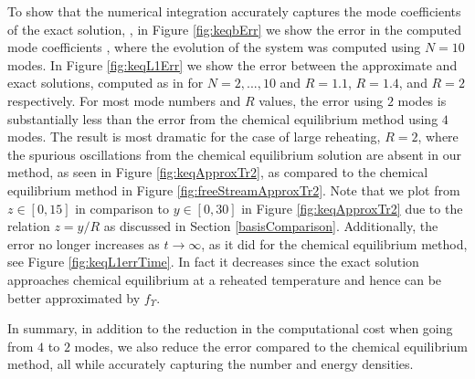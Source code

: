 To show that the numerical integration accurately captures the mode coefficients of the exact solution, , in Figure \ref{fig:keqbErr} we show the error in the computed mode coefficients , where the evolution of the system was computed using $N=10$ modes. In Figure \ref{fig:keqL1Err} we show the error between the approximate and exact solutions, computed as in  for $N=2,...,10$ and $R=1.1$, $R=1.4$, and $R=2$ respectively.  For most mode numbers and $R$ values, the error using $2$ modes is substantially less than the error from the chemical equilibrium method using $4$ modes.  The result is most dramatic for the case of large reheating, $R=2$, where the spurious oscillations from the chemical equilibrium solution are absent in our method, as seen in Figure \ref{fig:keqApproxTr2}, as compared to the chemical equilibrium method in Figure \ref{fig:freeStreamApproxTr2}.  Note that we plot from $z\in [0,15]$ in comparison to $y\in[0,30]$ in Figure \ref{fig:keqApproxTr2} due to the relation $z=y/R$ as discussed in Section \ref{basisComparison}. Additionally, the error no longer increases as $t\rightarrow\infty$, as it did for the chemical equilibrium method, see Figure \ref{fig:keqL1errTime}.  In fact it decreases since the exact solution approaches chemical equilibrium at a reheated temperature and hence can be better approximated by $f_\Upsilon$. 

In summary, in addition to the reduction in the computational cost when going from $4$ to $2$ modes, we also reduce the error compared to the chemical equilibrium method, all while accurately capturing the number and energy densities. 

